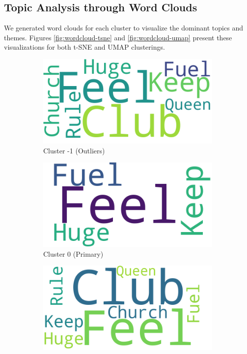 \documentclass[conference]{IEEEtran}
\begin{document}
\subsection{Topic Analysis through Word Clouds}
We generated word clouds for each cluster to visualize the dominant topics and themes. Figures \ref{fig:wordcloud-tsne} and \ref{fig:wordcloud-umap} present these visualizations for both t-SNE and UMAP clusterings.

\begin{figure}[!t]
\centering
\begin{subfigure}[b]{0.3\textwidth}
    \includegraphics[width=\textwidth]{images/word_cloud_cluster_m1_t-SNE}
    \caption{Cluster -1 (Outliers)}
\end{subfigure}
\begin{subfigure}[b]{0.3\textwidth}
    \includegraphics[width=\textwidth]{images/word_cloud_cluster_0_t-SNE}
    \caption{Cluster 0 (Primary)}
\end{subfigure}
\begin{subfigure}[b]{0.3\textwidth}
    \includegraphics[width=\textwidth]{images/word_cloud_cluster_1_t-SNE}

\end{subfigure}
\end{figure}
\end{document}

